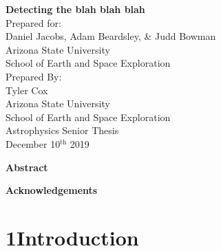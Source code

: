 \documentclass[12pt]{article}
\begin{document}
\doublespacing
\thispagestyle{empty}
\newpage
{}

\begin{center}
	{\Large \textbf{Detecting the blah blah blah}} \\
	[0.15\textheight]

	Prepared for: \\
	Daniel Jacobs, Adam Beardsley, \& Judd Bowman \\
	Arizona State University \\
	School of Earth and Space Exploration \\[0.15\textheight]

	Prepared By: \\
	Tyler Cox \\
	Arizona State University \\
	School of Earth and Space Exploration \\
	Astrophysics Senior Thesis \\
	December 10$^{\textrm{th}}$ 2019 \\
	[0.15\textheight]

\end{center}
\thispagestyle{empty}

\clearpage
{}

\begin{center}
	\textbf{Abstract}
\end{center}



\begingroup
\hypersetup{
	citecolor=DarkBlue,
	filecolor=black,
	linkcolor=black,
	urlcolor=DarkBlue
}
\renewcommand{\thesection}{\Roman{section}}
\tableofcontents
\listoffigures
\endgroup

\newpage

	\begin{center}
		\textbf{Acknowledgements}
	\end{center}

		




\tocless\section{\hypertarget{sec:introduction}{1\hspace{0.75em}Introduction}}
\end{document}
